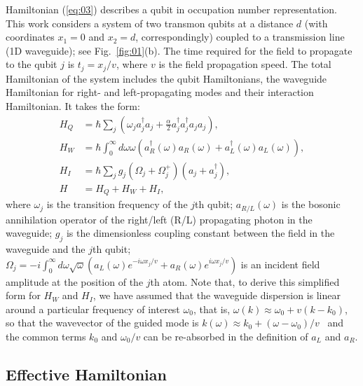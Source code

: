 \documentclass[lettersize,journal]{IEEEtran}
\begin{document}
Hamiltonian (\ref{eq:03}) describes a qubit in occupation number representation.
This work considers a system of two transmon qubits at a distance $d$ (with coordinates $x_1 = 0$ and $x_2 = d$, correspondingly)  coupled to a transmission line (1D waveguide); see Fig.~\ref{fig:01}(b).
The time required for the field to propagate to the qubit $j$ is $t_j = x_j / v$, where $v$ is the field propagation speed.
The total Hamiltonian of the system includes the qubit Hamiltonians, the waveguide Hamiltonian for right- and left-propagating modes and their interaction Hamiltonian.
It takes the form:
\begin{align} \label{eq:04}
    H_Q &= \hbar \sum_j \left( \omega_j a_j^\dag a_j + \frac{\alpha}{2} a_j^\dag a_j^\dag a_j a_j \right), \\
    H_W &= \hbar \int_0^\infty d \omega \omega \left( a_R^\dag(\omega) a_R(\omega) + a_L^\dag(\omega) a_L(\omega) \right), \\
    H_I &= \hbar \sum_j g_j (\Omega_j + \Omega_j^+) (a_j + a_j^\dag), \\
    H &= H_Q + H_W + H_I,
\end{align}
where $\omega_j$ is the transition frequency of the $j$th qubit; $a_{R/L}(\omega)$ is the bosonic annihilation operator of the right/left (R/L) propagating photon in the waveguide; $g_j$ is the dimensionless coupling constant between the field in the waveguide and the $j$th qubit; $\Omega_j = - i \int_0^\infty d \omega \sqrt{\omega} \left( a_L(\omega) e^{-i \omega x_j / v} + a_R(\omega) e^{i \omega x_j / v} \right)$ is an incident field amplitude at the position of the $j$th atom.
Note that, to derive this simplified form for $H_W$ and $H_I$, we have assumed that the waveguide dispersion is linear around a particular frequency of interest $\omega_0$, that is, $\omega(k) \approx \omega_0 + v (k - k_0)$, so that the wavevector of the guided mode is $k(\omega) \approx k_0 + (\omega - \omega_0) / v$~\cite{shen_theory_2009} and the common terms $k_0$ and $\omega_0/v$ can be re-absorbed in the definition of $a_L$ and $a_R$.

\subsection{Effective Hamiltonian}
\end{document}

